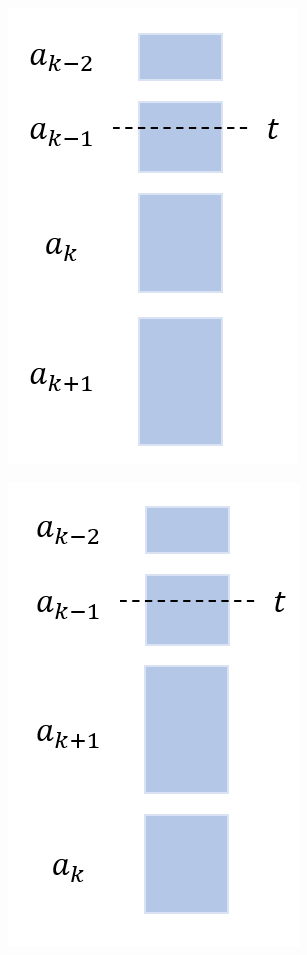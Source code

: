 \begin{figure}[h]
    \centering
    \begin{minipage}[c]{0.3\textwidth}
        \centering
        \includegraphics[height=0.2\textheight]{pics/p1.png}
        \label{fig:p1}
    \end{minipage} 
    \begin{minipage}[c]{0.3\textwidth}
        \centering
        \includegraphics[height=0.2\textheight]{pics/p2.png}

\end{minipage}
\end{figure}
